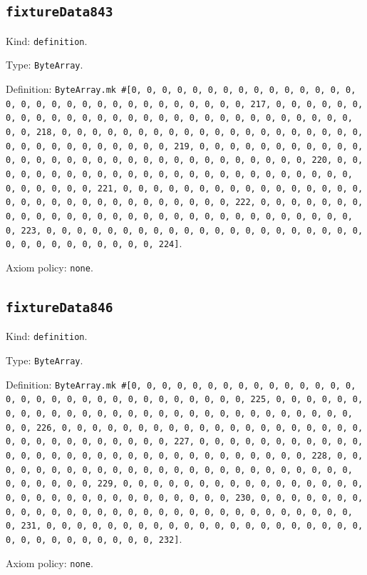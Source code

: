 \documentclass[11pt]{article}
\begin{document}
\subsection*{\texttt{fixtureData843}}
\noindent Kind: \texttt{definition}.\par
\noindent Type: \texttt{ByteArray}.\par
\noindent Definition: \texttt{ByteArray.mk \#[0, 0, 0, 0, 0, 0, 0, 0, 0, 0, 0, 0, 0, 0, 0, 0, 0, 0, 0, 0, 0, 0, 0, 0, 0, 0, 0, 0, 0, 0, 0, 217, 0, 0, 0, 0, 0, 0, 0, 0, 0, 0, 0, 0, 0, 0, 0, 0, 0, 0, 0, 0, 0, 0, 0, 0, 0, 0, 0, 0, 0, 0, 0, 218, 0, 0, 0, 0, 0, 0, 0, 0, 0, 0, 0, 0, 0, 0, 0, 0, 0, 0, 0, 0, 0, 0, 0, 0, 0, 0, 0, 0, 0, 0, 0, 219, 0, 0, 0, 0, 0, 0, 0, 0, 0, 0, 0, 0, 0, 0, 0, 0, 0, 0, 0, 0, 0, 0, 0, 0, 0, 0, 0, 0, 0, 0, 0, 220, 0, 0, 0, 0, 0, 0, 0, 0, 0, 0, 0, 0, 0, 0, 0, 0, 0, 0, 0, 0, 0, 0, 0, 0, 0, 0, 0, 0, 0, 0, 0, 221, 0, 0, 0, 0, 0, 0, 0, 0, 0, 0, 0, 0, 0, 0, 0, 0, 0, 0, 0, 0, 0, 0, 0, 0, 0, 0, 0, 0, 0, 0, 0, 222, 0, 0, 0, 0, 0, 0, 0, 0, 0, 0, 0, 0, 0, 0, 0, 0, 0, 0, 0, 0, 0, 0, 0, 0, 0, 0, 0, 0, 0, 0, 0, 223, 0, 0, 0, 0, 0, 0, 0, 0, 0, 0, 0, 0, 0, 0, 0, 0, 0, 0, 0, 0, 0, 0, 0, 0, 0, 0, 0, 0, 0, 0, 0, 224]}.\par
\noindent Axiom policy: \texttt{none}.\par
\subsection*{\texttt{fixtureData846}}
\noindent Kind: \texttt{definition}.\par
\noindent Type: \texttt{ByteArray}.\par
\noindent Definition: \texttt{ByteArray.mk \#[0, 0, 0, 0, 0, 0, 0, 0, 0, 0, 0, 0, 0, 0, 0, 0, 0, 0, 0, 0, 0, 0, 0, 0, 0, 0, 0, 0, 0, 0, 0, 225, 0, 0, 0, 0, 0, 0, 0, 0, 0, 0, 0, 0, 0, 0, 0, 0, 0, 0, 0, 0, 0, 0, 0, 0, 0, 0, 0, 0, 0, 0, 0, 226, 0, 0, 0, 0, 0, 0, 0, 0, 0, 0, 0, 0, 0, 0, 0, 0, 0, 0, 0, 0, 0, 0, 0, 0, 0, 0, 0, 0, 0, 0, 0, 227, 0, 0, 0, 0, 0, 0, 0, 0, 0, 0, 0, 0, 0, 0, 0, 0, 0, 0, 0, 0, 0, 0, 0, 0, 0, 0, 0, 0, 0, 0, 0, 228, 0, 0, 0, 0, 0, 0, 0, 0, 0, 0, 0, 0, 0, 0, 0, 0, 0, 0, 0, 0, 0, 0, 0, 0, 0, 0, 0, 0, 0, 0, 0, 229, 0, 0, 0, 0, 0, 0, 0, 0, 0, 0, 0, 0, 0, 0, 0, 0, 0, 0, 0, 0, 0, 0, 0, 0, 0, 0, 0, 0, 0, 0, 0, 230, 0, 0, 0, 0, 0, 0, 0, 0, 0, 0, 0, 0, 0, 0, 0, 0, 0, 0, 0, 0, 0, 0, 0, 0, 0, 0, 0, 0, 0, 0, 0, 231, 0, 0, 0, 0, 0, 0, 0, 0, 0, 0, 0, 0, 0, 0, 0, 0, 0, 0, 0, 0, 0, 0, 0, 0, 0, 0, 0, 0, 0, 0, 0, 232]}.\par
\noindent Axiom policy: \texttt{none}.\par
\end{document}

